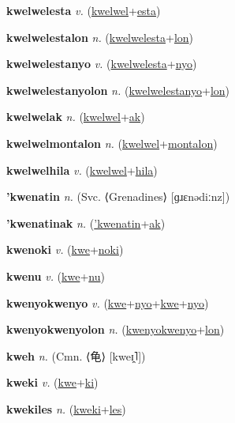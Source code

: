 \textbf{\hypertarget{kwelwelesta}{kwelwelesta}} \textit{v.} (\hyperlink{kwelwel}{kwelwel}+\allowbreak \hyperlink{esta}{esta})


\textbf{\hypertarget{kwelwelestalon}{kwelwelestalon}} \textit{n.} (\hyperlink{kwelwelesta}{kwelwelesta}+\allowbreak \hyperlink{lon}{lon})


\textbf{\hypertarget{kwelwelestanyo}{kwelwelestanyo}} \textit{v.} (\hyperlink{kwelwelesta}{kwelwelesta}+\allowbreak \hyperlink{nyo}{nyo})


\textbf{\hypertarget{kwelwelestanyolon}{kwelwelestanyolon}} \textit{n.} (\hyperlink{kwelwelestanyo}{kwelwelestanyo}+\allowbreak \hyperlink{lon}{lon})


\textbf{\hypertarget{kwelwelak}{kwelwelak}} \textit{n.} (\hyperlink{kwelwel}{kwelwel}+\allowbreak \hyperlink{ak}{ak})


\textbf{\hypertarget{kwelwelmontalon}{kwelwelmontalon}} \textit{n.} (\hyperlink{kwelwel}{kwelwel}+\allowbreak \hyperlink{montalon}{montalon})


\textbf{\hypertarget{kwelwelhila}{kwelwelhila}} \textit{v.} (\hyperlink{kwelwel}{kwelwel}+\allowbreak \hyperlink{hila}{hila})


\textbf{\hypertarget{'kwenatin}{'kwenatin}} \textit{n.} (Svc. ⟨Grenadines⟩ [ɡɹɛnədiːnz])


\textbf{\hypertarget{'kwenatinak}{'kwenatinak}} \textit{n.} (\hyperlink{'kwenatin}{'kwenatin}+\allowbreak \hyperlink{ak}{ak})


\textbf{\hypertarget{kwenoki}{kwenoki}} \textit{v.} (\hyperlink{kwe}{kwe}+\allowbreak \hyperlink{noki}{noki})


\textbf{\hypertarget{kwenu}{kwenu}} \textit{v.} (\hyperlink{kwe}{kwe}+\allowbreak \hyperlink{nu}{nu})


\textbf{\hypertarget{kwenyokwenyo}{kwenyokwenyo}} \textit{v.} (\hyperlink{kwe}{kwe}+\allowbreak \hyperlink{nyo}{nyo}+\allowbreak \hyperlink{kwe}{kwe}+\allowbreak \hyperlink{nyo}{nyo})


\textbf{\hypertarget{kwenyokwenyolon}{kwenyokwenyolon}} \textit{n.} (\hyperlink{kwenyokwenyo}{kwenyokwenyo}+\allowbreak \hyperlink{lon}{lon})


\textbf{\hypertarget{kweh}{kweh}} \textit{n.} (Cmn. ⟨{\chinese{}龟}⟩ [kweɪ̯˥])


\textbf{\hypertarget{kweki}{kweki}} \textit{v.} (\hyperlink{kwe}{kwe}+\allowbreak \hyperlink{ki}{ki})


\textbf{\hypertarget{kwekiles}{kwekiles}} \textit{n.} (\hyperlink{kweki}{kweki}+\allowbreak \hyperlink{les}{les})


